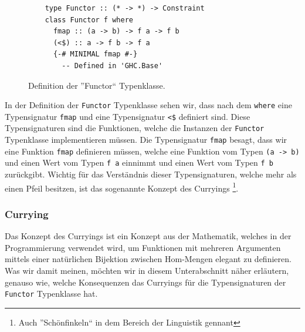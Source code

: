 \documentclass{hhuarticle}
\theoremstyle{definition}
\theoremstyle{theorem}
\begin{document}
  \begin{figure}[h]
    \begin{lstlisting}
    type Functor :: (* -> *) -> Constraint
    class Functor f where
      fmap :: (a -> b) -> f a -> f b
      (<$) :: a -> f b -> f a
      {-# MINIMAL fmap #-}
        -- Defined in 'GHC.Base'
    \end{lstlisting}
    \caption{Definition der ''Functor`` Typenklasse.}%
    \label{fig:functorTypeClass}
  \end{figure}

  In der Definition der \verb|Functor| Typenklasse sehen wir, dass
  nach dem \verb|where| eine Typensignatur \verb|fmap| und eine
  Typensignatur \verb|<$| definiert sind. Diese Typensignaturen
  sind die Funktionen, welche die Instanzen der \verb|Functor| Typenklasse
  implementieren müssen.
  Die Typensignatur \verb|fmap| besagt, dass
  wir eine Funktion \verb|fmap| definieren müssen, welche eine Funktion
  vom Typen \verb|(a -> b)| und einen Wert vom Typen \verb|f a| einnimmt
  und einen Wert vom Typen \verb|f b| zurückgibt. Wichtig für das
  Verständnis dieser Typensignaturen, welche mehr als einen Pfeil besitzen,
  ist das sogenannte Konzept des Curryings
  \footnote{Auch ''Schönfinkeln`` in dem Bereich der Linguistik gennant}.

  \subsubsection{Currying}

  Das Konzept des Curryings ist ein Konzept aus der Mathematik, welches
  in der Programmierung verwendet wird, um Funktionen mit mehreren
  Argumenten mittels einer natürlichen Bijektion zwischen $\text{Hom}$-Mengen
  elegant zu definieren. Was wir damit meinen, möchten wir in diesem
  Unterabschnitt näher erläutern, genauso wie, welche Konsequenzen
  das Curryings für die Typensignaturen der \verb|Functor| Typenklasse
  hat.
\end{document}
